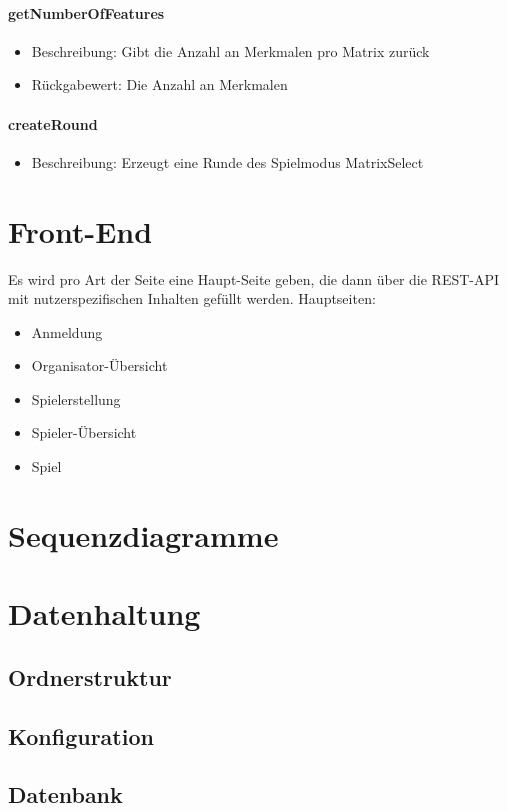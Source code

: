 \documentclass[a4paper]{scrreprt}
\begin{document}
   \subsubsection{getNumberOfFeatures}
      \begin{itemize}
      \item Beschreibung: Gibt die Anzahl an Merkmalen pro Matrix zurück
      \item Rückgabewert: Die Anzahl an Merkmalen
      \end{itemize}
   \subsubsection{createRound}
      \begin{itemize}
      \item Beschreibung: Erzeugt eine Runde des Spielmodus MatrixSelect
      \end{itemize}
   

   
   
   
	

    \chapter{Front-End}
    Es wird pro Art der Seite eine Haupt-Seite geben, die dann über die REST-API mit nutzerspezifischen Inhalten gefüllt werden.
    Hauptseiten:
    \begin{itemize}
    \item   Anmeldung
    \item   Organisator-Übersicht
    \item   Spielerstellung
    \item   Spieler-Übersicht
    \item   Spiel
    \end{itemize}
   \chapter{Sequenzdiagramme}

    \chapter{Datenhaltung}
        \section{Ordnerstruktur}
        \section{Konfiguration}
        \section{Datenbank}
\end{document}
